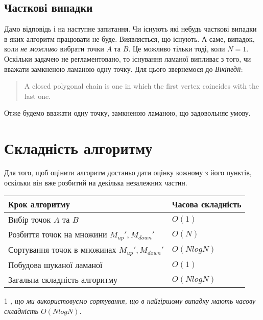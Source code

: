 \documentclass[a4paper,12pt,titlepage]{article}
\begin{document}
\subsection{Часткові випадки}

Дамо відповідь і на наступне запитання. Чи існують які небудь часткові випадки в яких алгоритм працювати не буде. Виявляється, що існують. А саме, випадок, коли \emph{не можливо} вибрати точки $A$ та $B$. Це можливо тільки тоді, коли $N = 1$. Оскільки задачею не регламентовано, то існування ламаної випливає з того, чи вважати замкненою ламаною одну точку. Для цього звернемося до \emph{Вікіпедії}:

\begin{quote}
A closed polygonal chain is one in which the first vertex coincides with the last one.
\end{quote} 

Отже будемо вважати одну точку, замкненою ламаною, що задовольняє умову.

\section{Складність алгоритму}

Для того, щоб оцінити алгоритм достаньо дати оцінку кожному з його пунктів, оскільки він вже розбитий на декілька незалежних частин.\\

\noindent
\begin{threeparttable}
	\begin{tabulary}{15cm}{ |p{10cm}|L| }
			\hline
			\textbf{Крок алгоритму} & \textbf{Часова складність} \\ \hline
			Вибір точок $A$ та $B$ & $O(1)$ \\ \hline
		Розбиття точок на множини $M_{up}', M_{down}'$ & $O(N)$ \\ \hline
		Сортування точок в множинах $M_{up}', M_{down}'$ & $O(NlogN)$\\ \hline
		Побудова шуканої ламаної & $O(1)$ \\ \hline
		Загальна складність алгоритму & $O(NlogN)$ \\ 
		\hline
	\end{tabulary}
	\begin{tablenotes}
		\item[1] \textit{, що ми використовуємо сортування, що в найгіршому випадку мають часову складність $O(NlogN)$.}
	\end{tablenotes}
\end{threeparttable}\\[10px]
\end{document}
